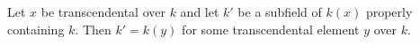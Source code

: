 Let $x$ be transcendental over $k$ and let $k'$ be a subfield of $k(x)$ properly containing $k$. Then $k' = k(y)$ for some transcendental element $y$ over $k$.
